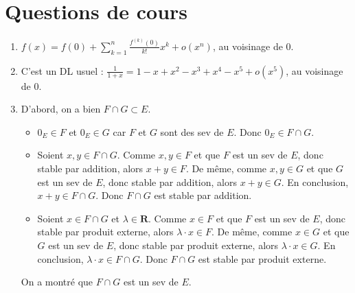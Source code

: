 \documentclass[12pt,a4paper]{article}
\begin{document}
\vspace{1\baselineskip}

\section*{Questions de cours}

\begin{enumerate}
	\item $\displaystyle f(x) = f(0) + \sum_{k=1}^n \frac{f^{(k)}(0)}{k!}x^k + o(x^n)$, au voisinage de 0.
	
	\vspace{0.5\baselineskip}
	
	\item C'est un DL usuel : $\displaystyle \frac{1}{1+x} = 1 - x + x^2 - x^3 + x^4 - x^5 + o(x^5)$, au voisinage de 0.
	
	\vspace{0.5\baselineskip}
	
	\item D'abord, on a bien $F \cap G \subset E$.
	
	\vspace{0.25\baselineskip}
	
	\begin{itemize}
		\item $0_E \in F$ et $0_E \in G$ car $F$ et $G$ sont des sev de $E$. Donc $0_E \in F \cap G$.
		
		\vspace{0.25\baselineskip}
		
		\item Soient $x, y \in F \cap G$. Comme $x, y \in F$ et que $F$ est un sev de $E$, donc stable par addition, alors $x + y \in F$. De même, comme $x, y \in G$ et que $G$ est un sev de $E$, donc stable par addition, alors $x + y \in G$. En conclusion, $x+y \in F \cap G$. Donc $F \cap G$ est stable par addition.
		
		\vspace{0.25\baselineskip}
		
		\item Soient $x \in F \cap G$ et $\lambda \in \mathbf{R}$. Comme $x \in F$ et que $F$ est un sev de $E$, donc stable par produit externe, alors $\lambda \cdot x \in F$. De même, comme $x \in G$ et que $G$ est un sev de $E$, donc stable par produit externe, alors $\lambda \cdot x \in G$. En conclusion, $\lambda \cdot x \in F \cap G$. Donc $F \cap G$ est stable par produit externe.
	\end{itemize}

	\vspace{0.25\baselineskip}

	On a montré que $F \cap G$ est un sev de $E$.
	\vspace{0.5\baselineskip}
\end{enumerate}
\end{document}
